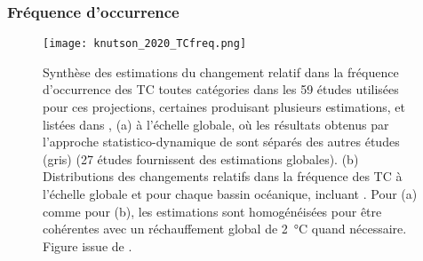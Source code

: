 \documentclass[../main.tex]{subfiles}
\begin{document}
\subsubsection*{Fréquence d'occurrence}

\begin{figure}[htb]
    \centering
    \texttt{[image: knutson\_2020\_TCfreq.png]}
    \caption{Synthèse des estimations du changement relatif dans la fréquence d'occurrence des TC toutes catégories dans les \num{59} études utilisées pour ces
        projections, certaines produisant plusieurs estimations, et listées dans \cite[][documents supplémentaires, tableau ES1]{knutson_tropical_2020}, (a) à
        l'échelle globale, où les résultats obtenus par l'approche statistico-dynamique de \textcite{emanuel_downscaling_2013} sont séparés des autres études (gris)
        (27 études fournissent des estimations globales). (b) Distributions des changements relatifs dans la fréquence des TC à l'échelle globale et pour chaque
        bassin océanique, incluant \textcite{emanuel_downscaling_2013}. Pour (a) comme pour (b), les estimations sont homogénéisées pour être cohérentes avec un
        réchauffement global de \SI{2}{\degreeCelsius} quand nécessaire. Figure issue de \textcite{knutson_tropical_2020}.}
    \label{fig:TC_freq_summary}
\end{figure}
\end{document}

